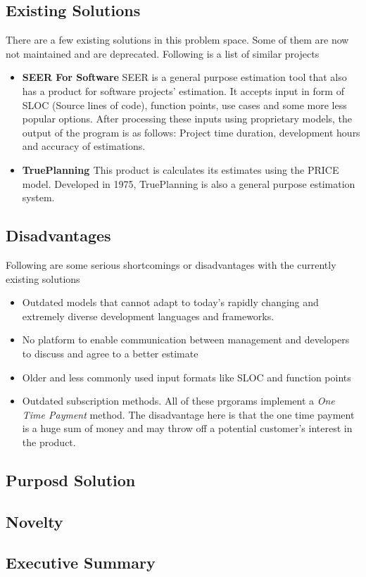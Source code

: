 \subsection{Existing Solutions}
There are a few existing solutions in this problem space. Some of them are now not maintained and are deprecated. Following is a list of similar projects
\begin{itemize}
	\item {\bf{SEER For Software}}\newline
	SEER is a general purpose estimation tool that also has a product for software projects' estimation. It accepts input in form of SLOC (Source lines of code), function points, use cases and some more less popular options. After processing these inputs using proprietary models, the output of the program is as follows: Project time duration, development hours and accuracy of estimations.

	\item {\bf{TruePlanning \small{\textregistered}}}\newline
	This product is calculates its estimates using the PRICE model. Developed in 1975, TruePlanning is also a general purpose estimation system.
	
\end{itemize}

\subsection{Disadvantages}
Following are some serious shortcomings or disadvantages with the currently existing solutions
\begin{itemize}
	\item Outdated models that cannot adapt to today's rapidly changing and extremely diverse development languages and frameworks.
	\item No platform to enable communication between management and developers to discuss and agree to a better estimate
	\item Older and less commonly used input formats like SLOC and function points
	\item Outdated subscription methods. All of these prgorams implement a {\it{One Time Payment}} method. The disadvantage here is that the one time payment is a huge sum of money and may throw off a potential customer's interest in the product.
\end{itemize}

\subsection{Purposd Solution}
\blindtext[2]

\subsection{Novelty}
\blindtext[1]

\subsection{Executive Summary}
\blindtext[2]

